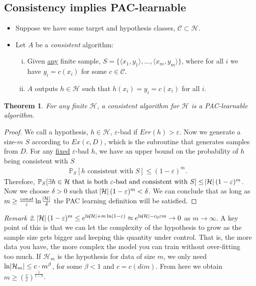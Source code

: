 \documentclass[12pt, letterpaper]{article}
\numberwithin{equation}{section} %
\newcommand{\ul}{\underline}
\newcommand{\mb}{\mathbb}
\newcommand{\mc}{\mathcal}
\newcommand{\ve}{\varepsilon}
\newtheorem{theorem}{Theorem}[section]
\theoremstyle{definition}
\theoremstyle{remark}
\newtheorem{remark}[theorem]{Remark}
\begin{document}
\subsection{Consistency implies PAC-learnable}
\begin{itemize}
\item Suppose we have some target and hypothesis classes, $\mc C \subset \mc H$.
\item Let $A$ be a \emph{consistent} algorithm:
    \begin{enumerate}[i)]
    \item Given \ul{any} finite sample, $S=\lbrace \langle x_1,y_1\rangle,\ldots,\langle x_m,y_m\rangle\rbrace$, where  for all $i$ we have $y_i = c(x_i)$ for some $c\in \mc C$.
    \item $A$ outputs $h\in\mc H$ such that $h(x_i)=y_i=c(x_i)$ for all $i$.
    \end{enumerate}
\end{itemize}

\begin{theorem}
    For any finite $\mc H$, a  consistent algorithm  for $\mc H$ is a PAC-learnable algorithm.
\end{theorem}
\begin{proof}
    We call a hypothesis, $h\in\mc H$, $\ve$-bad if $Err(h)>\ve$. Now we generate a size-$m$ $S$ according to $Ex(c, D)$, which is the subroutine that generates samples from $D$. For any \ul{fixed} $\ve$-bad $h$, we have an upper bound on the probability of $h$ being consistent with $S$
    \begin{align}
        \mb P_{S}[h\textrm{ consistent with }S] \leq (1-\ve)^m.
    \end{align}
    Therefore,  $\mb P_{S}[\exists h\in\mc H\textrm{ that is both $\ve$-bad and consistent with } S] \leq \abs{\mc H}(1-\ve)^m$. Now we choose $\delta > 0$ such that  $\abs{\mc H}(1-\ve)^m < \delta$. We can conclude that as long as $m \geq \frac{const}\ve \ln\frac{\abs{\mc H}}\delta$ the PAC learning definition will be satisfied.
\end{proof}
\begin{remark}
    $\abs{\mc H}(1-\ve)^m \leq e^{ \ln\abs{\mc H} + m\ln(1-\ve)}\approx e^{\ln\abs{\mc H} - c_0\ve m} \to 0$ as $m\to\infty$. A key point of this is that we can let the complexity of the hypothesis to grow as the sample size gets bigger and keeping this quantity under control. That is, the more data you have, the more complex the model you can train without over-fitting too much. If $\mc H_m$ is the hypothesis for data of size $m$, we only need $\ln\abs{\mc H_m} \leq c \cdot m^\beta$, for some $\beta < 1$ and $c=c(dim)$. From here we obtain $ m \geq \left(\frac c\ve\right)^{\frac1{1-\beta}}$.
\end{remark}
\end{document}
